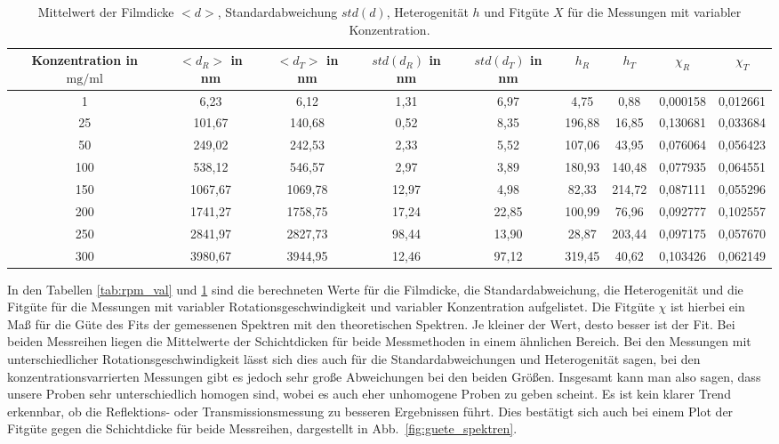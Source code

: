 \begin{table}[h!]
    \centering
    \begin{tabular}{|c|c|c|c|c|c|c|c|c|}
        \hline
        \makecell{Konzentration\\in $\si{\milli\gram\per\milli\litre}$} & \makecell{$<d_R>$\\in nm} & \makecell{$<d_T>$\\in nm} & \makecell{$std(d_R)$\\in nm} & \makecell{$std(d_T)$\\in nm}& $h_R$ & $h_T$ & $\chi_R$ & $\chi_T$ \\ [0.5ex]
        \hline \hline
        1 & 6,23 & 6,12 & 1,31 & 6,97 & 4,75 & 0,88 & 0,000158 & 0,012661 \\
        25 & 101,67 & 140,68 & 0,52 & 8,35 & 196,88 & 16,85 & 0,130681 & 0,033684 \\
        50 & 249,02 & 242,53 & 2,33 & 5,52 & 107,06 & 43,95 & 0,076064 & 0,056423 \\
        100 & 538,12 & 546,57 & 2,97 & 3,89 & 180,93 & 140,48 & 0,077935 & 0,064551 \\
        150 & 1067,67 & 1069,78 & 12,97 & 4,98 & 82,33 & 214,72 & 0,087111 & 0,055296 \\
        200 & 1741,27 & 1758,75 & 17,24 & 22,85 & 100,99 & 76,96 & 0,092777 & 0,102557 \\
        250 & 2841,97 & 2827,73 & 98,44 & 13,90 & 28,87 & 203,44 & 0,097175 & 0,057670 \\
        300 & 3980,67 & 3944,95 & 12,46 & 97,12 & 319,45 & 40,62 & 0,103426 & 0,062149 \\[1ex]
       \hline
       \end{tabular}
       \caption{Mittelwert der Filmdicke $<d>$, Standardabweichung $std(d)$, Heterogenität $h$ und Fitgüte $X$ für die Messungen mit variabler Konzentration.}
       \label{tab:conc_val}
    \end{table}

In den Tabellen \ref{tab:rpm_val} und \ref{tab:conc_val} sind die berechneten Werte für die Filmdicke, die Standardabweichung, die Heterogenität und die Fitgüte für die Messungen mit variabler Rotationsgeschwindigkeit und variabler Konzentration aufgelistet. Die Fitgüte $\chi$ ist hierbei ein Maß für die Güte des Fits der gemessenen Spektren mit den theoretischen Spektren. Je kleiner der Wert, desto besser ist der Fit.
Bei beiden Messreihen liegen die Mittelwerte der Schichtdicken für beide Messmethoden in einem ähnlichen Bereich. Bei den Messungen mit unterschiedlicher Rotationsgeschwindigkeit lässt sich dies auch für die Standardabweichungen und Heterogenität sagen, bei den konzentrationsvarrierten Messungen gibt es jedoch sehr große Abweichungen bei den beiden Größen. Insgesamt kann man also sagen, dass unsere Proben sehr unterschiedlich homogen sind, wobei es auch eher unhomogene Proben zu geben scheint.
Es ist kein klarer Trend erkennbar, ob die Reflektions- oder Transmissionsmessung zu besseren Ergebnissen führt. Dies bestätigt sich auch bei einem Plot der Fitgüte gegen die Schichtdicke für beide Messreihen, dargestellt in Abb.~\ref{fig:guete_spektren}.



